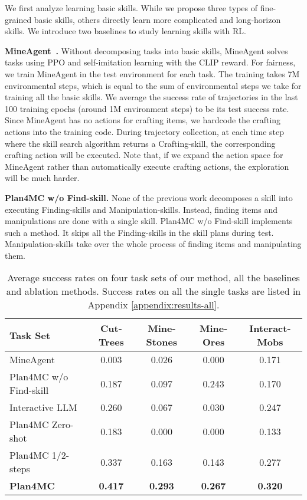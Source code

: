 \documentclass{article}
\begin{document}
We first analyze learning basic skills. While we propose three types of fine-grained basic skills, others directly learn more complicated and long-horizon skills. We introduce two baselines to study learning skills with RL.

\textbf{MineAgent~\citep{minedojo}.} Without decomposing tasks into basic skills, MineAgent solves tasks using PPO and self-imitation learning with the CLIP reward. For fairness, we train MineAgent in the test environment for each task. The training takes 7M environmental steps, which is equal to the sum of environmental steps we take for training all the basic skills. We average the success rate of trajectories in the last 100 training epochs (around 1M environment steps) to be its test success rate. Since MineAgent has no actions for crafting items, we hardcode the crafting actions into the training code. During trajectory collection, at each time step where the skill search algorithm returns a Crafting-skill, the corresponding crafting action will be executed. Note that, if we expand the action space for MineAgent rather than automatically execute crafting actions, the exploration will be much harder.

\textbf{Plan4MC w/o Find-skill.} None of the previous work decomposes a skill into executing Finding-skills and Manipulation-skills. Instead, finding items and manipulations are done with a single skill. Plan4MC w/o Find-skill implements such a method. It skips all the Finding-skills in the skill plans during test. Manipulation-skills take over the whole process of finding items and manipulating them. 

\begin{table}[!t]
  \caption{Average success rates on four task sets of our method, all the baselines and ablation methods. Success rates on all the single tasks are listed in Appendix \ref{appendix:results-all}.}
  \label{tab:results}
  \centering
  \begin{tabular}{lcccc}
    \toprule
    Task Set  & Cut-Trees & Mine-Stones &  Mine-Ores & Interact-Mobs \\
    \midrule
    MineAgent  & 0.003  & 0.026 & 0.000 & 0.171 \\
    {Plan4MC w/o Find-skill}  & 0.187  & 0.097 & 0.243 & 0.170 \\
    \midrule
    {Interactive LLM}  &  0.260 & 0.067 & 0.030 & 0.247  \\
    {Plan4MC Zero-shot}  & 0.183  &  0.000 & 0.000 & 0.133 \\
    {Plan4MC 1/2-steps}  & 0.337  &  0.163 & 0.143 & 0.277 \\
    \midrule
    \textbf{Plan4MC}  & \textbf{0.417} &  \textbf{0.293} & \textbf{0.267} & \textbf{0.320} \\
    \bottomrule
  \end{tabular}
\end{table}
\end{document}
